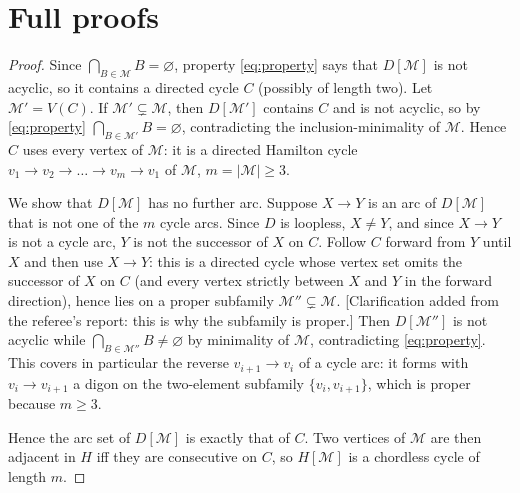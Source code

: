\documentclass[11pt,a4paper]{article}
\theoremstyle{plain}
\theoremstyle{definition}
\theoremstyle{remark}
\newcommand{\cM}{\mathcal M}
\begin{document}
\appendix

\section{Full proofs}\label{app:proofs}

\label{pf:min}
\lemmin*
\begin{proof}
Since $\bigcap_{B\in\cM}B=\varnothing$, property \eqref{eq:property} says that $D[\cM]$ is not acyclic, so it contains a directed cycle $C$ (possibly of length two). Let $\cM'=V(C)$. If $\cM'\subsetneq\cM$, then $D[\cM']$ contains $C$ and is not acyclic, so by \eqref{eq:property} $\bigcap_{B\in\cM'}B=\varnothing$, contradicting the inclusion-minimality of $\cM$. Hence $C$ uses every vertex of $\cM$: it is a directed Hamilton cycle $v_1\to v_2\to\dots\to v_m\to v_1$ of $\cM$, $m=|\cM|\ge3$.

We show that $D[\cM]$ has no further arc. Suppose $X\to Y$ is an arc of $D[\cM]$ that is not one of the $m$ cycle arcs. Since $D$ is loopless, $X\ne Y$, and since $X\to Y$ is not a cycle arc, $Y$ is not the successor of $X$ on $C$. Follow $C$ forward from $Y$ until $X$ and then use $X\to Y$: this is a directed cycle whose vertex set omits the successor of $X$ on $C$ (and every vertex strictly between $X$ and $Y$ in the forward direction), hence lies on a proper subfamily $\cM''\subsetneq\cM$. [Clarification added from the referee's report: this is why the subfamily is proper.] Then $D[\cM'']$ is not acyclic while $\bigcap_{B\in\cM''}B\ne\varnothing$ by minimality of $\cM$, contradicting \eqref{eq:property}. This covers in particular the reverse $v_{i+1}\to v_i$ of a cycle arc: it forms with $v_i\to v_{i+1}$ a digon on the two-element subfamily $\{v_i,v_{i+1}\}$, which is proper because $m\ge3$.

Hence the arc set of $D[\cM]$ is exactly that of $C$. Two vertices of $\cM$ are then adjacent in $H$ iff they are consecutive on $C$, so $H[\cM]$ is a chordless cycle of length $m$.
\end{proof}
\end{document}
